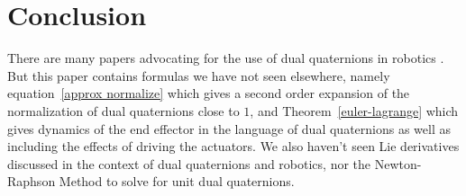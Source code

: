 \documentclass[reqno,12pt]{amsart}
\begin{document}
\section{Conclusion}

There are many papers advocating for the use of dual quaternions in robotics \cite{adorno,han-et-al,wang-et-al}.  But this paper contains formulas we have not seen elsewhere, namely equation~\eqref{approx normalize} which gives a second order expansion of the normalization of dual quaternions close to $1$, and Theorem~\ref{euler-lagrange} which gives dynamics of the end effector in the language of dual quaternions as well as including the effects of driving the actuators.  We also haven't seen Lie derivatives discussed in the context of dual quaternions and robotics, nor the Newton-Raphson Method to solve for unit dual quaternions.
\end{document}
